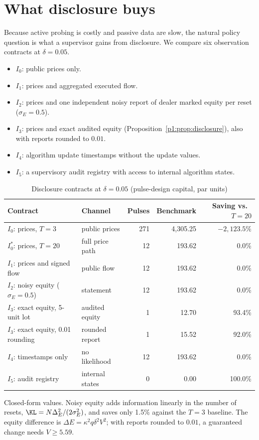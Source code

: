 \section{What disclosure buys}\label{p1:sec:disclosure}

Because active probing is costly and passive data are slow, the natural policy question is what a supervisor gains from disclosure. We compare six observation contracts at $\delta=0.05$.
\begin{itemize}[itemsep=1pt]
\item $I_0$: public prices only.
\item $I_1$: prices and aggregated executed flow.
\item $I_2$: prices and one independent noisy report of dealer marked equity per reset ($\sigma_E=0.5$).
\item $I_3$: prices and exact audited equity (Proposition~\ref{p1:prop:disclosure}), also with reports rounded to $0.01$.
\item $I_4$: algorithm update timestamps without the update values.
\item $I_5$: a supervisory audit registry with access to internal algorithm states.
\end{itemize}

\begin{table}[t]\centering\small
\begin{threeparttable}
\caption{Disclosure contracts at $\delta=0.05$ (pulse-design capital, par units)}\label{p1:tab:contracts}
\begin{tabular}{llrrr}
\toprule
Contract & Channel & Pulses & Benchmark & Saving vs.\ $T=20$\\
\midrule
$I_0$: prices, $T=3$ & public prices & 271 & 4{,}305.25 & $-2{,}123.5\%$\\
$I_0^*$: prices, $T=20$ & full price path & 12 & 193.62 & 0.0\%\\
$I_1$: prices and signed flow & public flow & 12 & 193.62 & 0.0\%\\
$I_2$: noisy equity ($\sigma_E=0.5$) & statement & 12 & 193.62 & 0.0\%\\
$I_3$: exact equity, 5-unit lot & audited equity & 1 & 12.70 & 93.4\%\\
$I_3$: exact equity, 0.01 rounding & rounded report & 1 & 15.52 & 92.0\%\\
$I_4$: timestamps only & no likelihood & 12 & 193.62 & 0.0\%\\
$I_5$: audit registry & internal states & 0 & 0.00 & 100.0\%\\
\bottomrule
\end{tabular}
\begin{tablenotes}\footnotesize\item Closed-form values. Noisy equity adds information linearly in the number of resets, $\KL=N\Delta_E^2/(2\sigma_E^2)$, and saves only 1.5\% against the $T=3$ baseline. The equity difference is $\Delta E=\kappa^2q\delta^2V^2$; with reports rounded to $0.01$, a guaranteed change needs $V\ge5.59$.\end{tablenotes}
\end{threeparttable}
\end{table}

